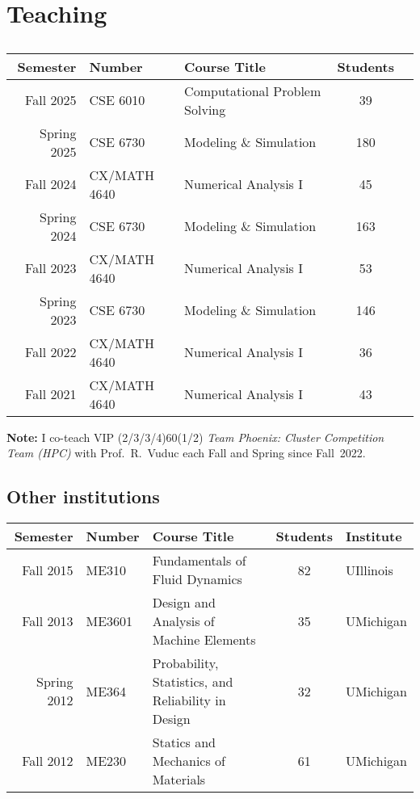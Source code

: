 \section{Teaching}

\subsection{\GIT}

\begin{center}
    \begin{longtable}{ r l l c c }
        \bf Semester&\bf Number     & \bf Course Title                  & \bf Students  \\ \midrule
        Fall 2025   & CSE 6010       & Computational Problem Solving    & \phantom{1}39 \\
        Spring 2025 & CSE 6730       & Modeling \& Simulation           & 180 \\
        Fall 2024   & CX/MATH 4640   & Numerical Analysis I             & \phantom{1}45 \\
        Spring 2024 & CSE 6730       & Modeling \& Simulation           & 163 \\
        Fall 2023   & CX/MATH 4640   & Numerical Analysis I             & \phantom{1}53 \\
        Spring 2023 & CSE 6730       & Modeling \& Simulation           & 146           \\
        Fall 2022   & CX/MATH 4640   & Numerical Analysis I             & \phantom{1}36 \\
        Fall 2021   & CX/MATH 4640   & Numerical Analysis I             & \phantom{1}43 
    \end{longtable}
\end{center}
\vspace{-0.8cm}
\textbf{Note:} I co-teach VIP (2/3/3/4)60(1/2) \textit{Team Phoenix: Cluster Competition Team (HPC)} with Prof.~R.~Vuduc each Fall and Spring since Fall~2022.

\subsection{Other institutions}

\begin{center}
    \begin{tabular}{ r l l c l }
        \bf Semester  &\bf Number & \bf Course Title & \bf Students & \bf Institute \\
        \midrule
        Fall   2015 & ME310  & Fundamentals of Fluid Dynamics & 82 & UIllinois \\
        Fall   2013 & ME3601 & Design and Analysis of Machine Elements & 35 & UMichigan\\
        Spring 2012 & ME364  & Probability, Statistics, and Reliability in Design & 32 & UMichigan \\
        Fall   2012 & ME230  & Statics and Mechanics of Materials & 61 & UMichigan \\
    \end{tabular}
\end{center}

